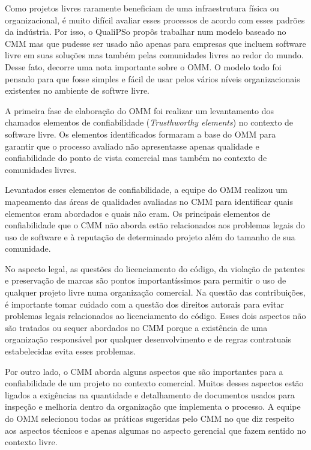 Como projetos livres raramente beneficiam de uma infraestrutura física
ou organizacional, é muito difícil avaliar esses processos de acordo
com esses padrões da indústria. Por isso, o QualiPSo propôs trabalhar
num modelo baseado no CMM mas que pudesse ser usado não apenas para
empresas que incluem software livre em suas soluções mas também pelas
comunidades livres ao redor do mundo. Desse fato, decorre uma nota
importante sobre o OMM. O modelo todo foi pensado para que fosse
simples e fácil de usar pelos vários níveis organizacionais existentes
no ambiente de softwre livre.

A primeira fase de elaboração do OMM foi realizar um levantamento dos
chamados elementos de confiabilidade (\textit{Trusthworthy elements})
no contexto de software livre. Os elementos identificados formaram a
base do OMM para garantir que o processo avaliado não apresentasse
apenas qualidade e confiabilidade do ponto de vista comercial mas
também no contexto de comunidades livres.

Levantados esses elementos de confiabilidade, a equipe do OMM realizou
um mapeamento das áreas de qualidades avaliadas no CMM para
identificar quais elementos eram abordados e quais não eram. Os
principais elementos de confiabilidade que o CMM não aborda estão
relacionados aos problemas legais do uso de software e à reputação de
determinado projeto além do tamanho de sua comunidade.

No aspecto legal, as questões do licenciamento do código, da violação
de patentes e preservação de marcas são pontos importantíssimos para
permitir o uso de qualquer projeto livre numa organização
comercial. Na questão das contribuições, é importante tomar cuidado
com a questão dos direitos autorais para evitar problemas legais
relacionados ao licenciamento do código.  Esses dois aspectos não são
tratados ou sequer abordados no CMM porque a existência de uma
organização responsável por qualquer desenvolvimento e de regras
contratuais estabelecidas evita esses problemas.

Por outro lado, o CMM aborda alguns aspectos que são importantes para
a confiabilidade de um projeto no contexto comercial. Muitos desses
aspectos estão ligados a exigências na quantidade e detalhamento de
documentos usados para inspeção e melhoria dentro da organização que
implementa o processo. A equipe do OMM selecionou todas as práticas
sugeridas pelo CMM no que diz respeito aos aspectos técnicos e apenas
algumas no aspecto gerencial que fazem sentido no contexto livre.

